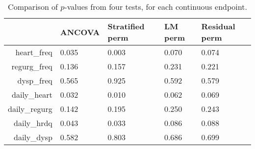 \begin{table}[ht]
\centering
\begin{tabular}{r|p{1in}p{1in}p{1in}p{1in}}
  \hline
 & ANCOVA & Stratified perm & LM perm & Residual perm \\ 
  \hline
heart\_freq & 0.035 & 0.003 & 0.070 & 0.074 \\ 
  regurg\_freq & 0.136 & 0.157 & 0.231 & 0.221 \\ 
  dysp\_freq & 0.565 & 0.925 & 0.592 & 0.579 \\ 
  daily\_heart & 0.032 & 0.010 & 0.062 & 0.069 \\ 
  daily\_regurg & 0.142 & 0.195 & 0.250 & 0.243 \\ 
  daily\_hrdq & 0.043 & 0.033 & 0.086 & 0.088 \\ 
  daily\_dysp & 0.582 & 0.803 & 0.686 & 0.699 \\ 
   \hline
\end{tabular}
\caption{Comparison of $p$-values from four tests, for each continuous endpoint.} 
\label{tab:clinical_pvalues}
\end{table}
